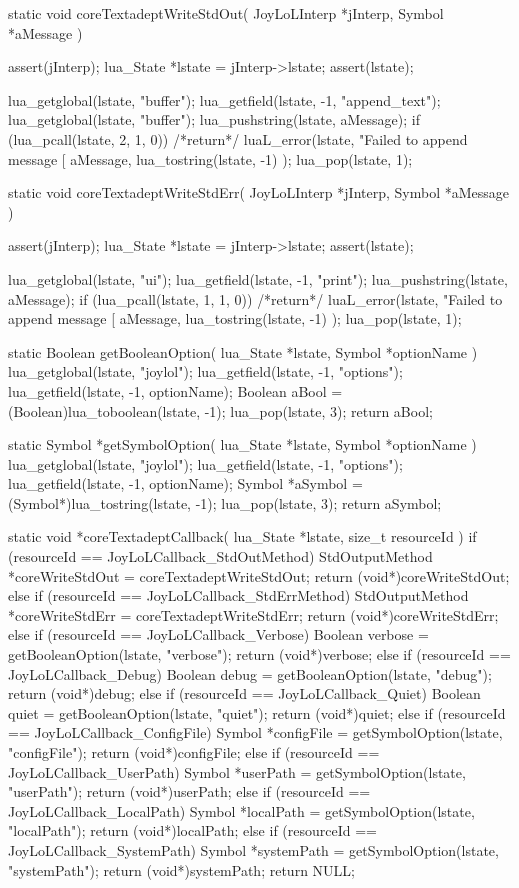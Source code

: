 static void coreTextadeptWriteStdOut(
  JoyLoLInterp *jInterp,
  Symbol       *aMessage
) {
  assert(jInterp);
  lua_State *lstate = jInterp->lstate;
  assert(lstate);

  lua_getglobal(lstate, "buffer");
  lua_getfield(lstate, -1, "append_text");
  lua_getglobal(lstate, "buffer");
  lua_pushstring(lstate, aMessage);
  if (lua_pcall(lstate, 2, 1, 0)) {
    /*return*/ luaL_error(lstate,
      "Failed to append message [%
      aMessage,
      lua_tostring(lstate, -1)
    );
  }
  lua_pop(lstate, 1);
}

static void coreTextadeptWriteStdErr(
  JoyLoLInterp *jInterp,
  Symbol       *aMessage
) {
  assert(jInterp);
  lua_State *lstate = jInterp->lstate;
  assert(lstate);

  lua_getglobal(lstate, "ui");
  lua_getfield(lstate, -1, "print");
  lua_pushstring(lstate, aMessage);
  if (lua_pcall(lstate, 1, 1, 0)) {
    /*return*/ luaL_error(lstate,
      "Failed to append message [%
      aMessage,
      lua_tostring(lstate, -1)
    );
  }
  lua_pop(lstate, 1);
}

static Boolean getBooleanOption(
  lua_State *lstate, 
  Symbol    *optionName
) {
  lua_getglobal(lstate, "joylol");
  lua_getfield(lstate, -1, "options");
  lua_getfield(lstate, -1, optionName);
  Boolean aBool = (Boolean)lua_toboolean(lstate, -1);
  lua_pop(lstate, 3);
  return aBool;
}

static Symbol *getSymbolOption(
  lua_State *lstate,
  Symbol    *optionName
) {
  lua_getglobal(lstate, "joylol");
  lua_getfield(lstate, -1, "options");
  lua_getfield(lstate, -1, optionName);
  Symbol *aSymbol = (Symbol*)lua_tostring(lstate, -1);
  lua_pop(lstate, 3);
  return aSymbol;
}

static void *coreTextadeptCallback(
  lua_State *lstate,
  size_t resourceId
) {
  if (resourceId == JoyLoLCallback_StdOutMethod) {
    StdOutputMethod *coreWriteStdOut =
      coreTextadeptWriteStdOut;
    return (void*)coreWriteStdOut;
  } else if (resourceId == JoyLoLCallback_StdErrMethod) {
    StdOutputMethod *coreWriteStdErr =
      coreTextadeptWriteStdErr;
    return (void*)coreWriteStdErr;
  } else if (resourceId == JoyLoLCallback_Verbose) {
    Boolean verbose = getBooleanOption(lstate, "verbose");
    return (void*)verbose;
  } else if (resourceId == JoyLoLCallback_Debug) {
    Boolean debug = getBooleanOption(lstate, "debug");
    return (void*)debug;
  } else if (resourceId == JoyLoLCallback_Quiet) {
    Boolean quiet = getBooleanOption(lstate, "quiet");
    return (void*)quiet;
  } else if (resourceId == JoyLoLCallback_ConfigFile) {
    Symbol *configFile = getSymbolOption(lstate, "configFile");
    return (void*)configFile;
  } else if (resourceId == JoyLoLCallback_UserPath) {
    Symbol *userPath = getSymbolOption(lstate, "userPath");
    return (void*)userPath;
  } else if (resourceId == JoyLoLCallback_LocalPath) {
    Symbol *localPath = getSymbolOption(lstate, "localPath");
    return (void*)localPath;
  } else if (resourceId == JoyLoLCallback_SystemPath) {
    Symbol *systemPath = getSymbolOption(lstate, "systemPath");
    return (void*)systemPath;
  }
  return NULL;
} 

